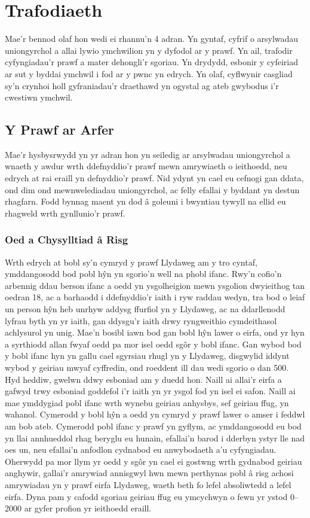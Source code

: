 ﻿\chapter{Trafodiaeth}
Mae'r bennod olaf hon wedi ei rhannu'n 4 adran. Yn gyntaf, cyfrif o arsylwadau uniongyrchol a allai lywio ymchwilion yn y dyfodol ar y prawf. Yn ail, trafodir cyfyngiadau'r prawf a mater dehongli'r sgoriau. Yn drydydd, esbonir y cyfeiriad ar sut y byddai ymchwil i fod ar y pwnc yn edrych. Yn olaf, cyflwynir casgliad sy'n crynhoi holl gyfraniadau'r draethawd yn ogystal ag ateb gwybodus i'r cwestiwn ymchwil.

\section{Y Prawf ar Arfer}
Mae'r hysbysrwydd yn yr adran hon yn seiledig ar arsylwadau uniongyrchol a wnaeth y awdur wrth ddefnyddio'r prawf mewn amrywiaeth o ieithoedd, neu edrych at rai eraill yn defnyddio'r prawf. Nid ydynt yn cael eu cefnogi gan ddata, ond dim ond mewnwelediadau uniongyrchol, ac felly efallai y byddant yn destun rhagfarn. Fodd bynnag maent yn dod â goleuni i bwyntiau tywyll na ellid eu rhagweld wrth gynllunio'r prawf.

\subsection{Oed a Chysylltiad â Risg}
Wrth edrych at bobl sy'n cymryd y prawf Llydaweg am y tro cyntaf, ymddangosodd bod pobl hŷn yn sgorio'n well na phobl ifanc. Rwy'n cofio'n arbennig ddau berson ifanc a oedd yn ysgolheigion mewn ysgolion dwyieithog tan oedran 18, ac a barhaodd i ddefnyddio'r iaith i ryw raddau wedyn, tra bod o leiaf un person hŷn heb unrhyw addysg ffurfiol yn y Llydaweg, ac na ddarllenodd lyfrau byth yn yr iaith, gan ddysgu'r iaith drwy ryngweithio cymdeithasol achlysurol yn unig. Mae'n bosibl iawn bod gan bobl hŷn lawer o eirfa, ond yr hyn a syrthiodd allan fwyaf oedd pa mor isel oedd sgôr y bobl ifanc. Gan wybod bod y bobl ifanc hyn yn gallu cael sgyrsiau rhugl yn y Llydaweg, disgwylid iddynt wybod y geiriau mwyaf cyffredin, ond roeddent ill dau wedi sgorio o dan 500. Hyd heddiw, gwelwn ddwy esboniad am y duedd hon. Naill ai allai'r eirfa a gafwyd trwy esboniad goddefol i'r iaith yn yr ysgol fod yn isel ei safon. Naill ai mae ymddygiad pobl ifanc wrth wynebu geiriau anhysbys, sef geiriau ffug, yn wahanol. Cymerodd y bobl hŷn a oedd yn cymryd y prawf lawer o amser i feddwl am bob ateb. Cymerodd pobl ifanc y prawf yn gyflym, ac ymddangosodd eu bod yn llai annhueddol rhag beryglu eu hunain, efallai'n barod i dderbyn ystyr lle nad oes un, neu efallai'n anfodlon cydnabod eu anwybodaeth a'u cyfyngiadau. Oherwydd pa mor llym yr oedd y sgôr yn cael ei gostwng wrth gydnabod geiriau anghywir, gallai'r amrywiad annisgwyl hwn mewn perthynas pobl â risg achosi amrywiadau yn y prawf eirfa Llydaweg, waeth beth fo lefel absoliwtedd a lefel eirfa. Dyna pam y cafodd sgoriau geiriau ffug eu ymcychwyn o fewn yr ystod 0–2000 ar gyfer profion yr ieithoedd eraill.

